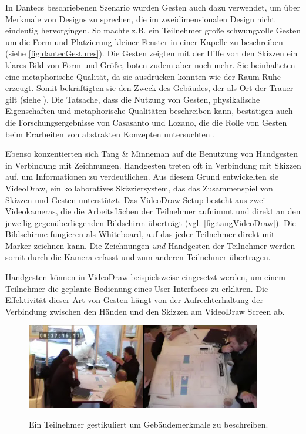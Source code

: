 \medskip In Dantecs beschriebenen Szenario wurden Gesten auch dazu verwendet, um über Merkmale von Designs zu sprechen, die im zweidimensionalen Design nicht eindeutig hervorgingen. So machte z.B. ein Teilnehmer große schwungvolle Gesten um die Form und Platzierung kleiner Fenster in einer Kapelle zu beschreiben (siehe \autoref{fig:dantecGestures}). Die Gesten zeigten mit der Hilfe von den Skizzen ein klares Bild von Form und Größe, boten zudem aber noch mehr. Sie beinhalteten eine metaphorische Qualität, da sie ausdrücken konnten wie der Raum Ruhe erzeugt. Somit bekräftigten sie den Zweck des Gebäudes, der als Ort der Trauer gilt (siehe ). Die Tatsache, dass die Nutzung von Gesten, physikalische Eigenschaften und metaphorische Qualitäten beschreiben kann, bestätigen auch die Forschungsergebnisse von Casasanto und Lozano, die die Rolle von Gesten beim Erarbeiten von abstrakten Konzepten untersuchten \citep{Casasanto:2006}.

\medskip Ebenso konzentierten sich Tang \& Minneman \citep{Tang:1991p28} auf die Benutzung von Handgesten in Verbindung mit Zeichnungen. Handgesten treten oft in Verbindung mit Skizzen auf, um Informationen zu verdeutlichen. Aus diesem Grund entwickelten sie VideoDraw, ein kollaboratives Skizziersystem, das das Zusammenspiel von Skizzen und Gesten unterstützt. Das VideoDraw Setup besteht aus zwei Videokameras, die die Arbeitsflächen der Teilnehmer aufnimmt und direkt an den jeweilig gegenüberliegenden Bildschirm überträgt (vgl. \autoref{fig:tangVideoDraw}). Die Bildschirme fungieren als Whiteboard, auf das jeder Teilnehmer direkt mit Marker zeichnen kann. Die Zeichnungen \emph{und} Handgesten der Teilnehmer werden somit durch die Kamera erfasst und zum anderen Teilnehmer übertragen.

\medskip Handgesten können in VideoDraw beispielsweise eingesetzt werden, um einem Teilnehmer die geplante Bedienung eines User Interfaces zu erklären. Die Effektivität dieser Art von Gesten hängt von der Aufrechterhaltung der Verbindung zwischen den Händen und den Skizzen am VideoDraw Screen ab.

\medskip
\begin{figure}[bth]
	{\includegraphics[width=\linewidth]{gfx/dantecGestures}}
	\caption[Beispiel von Gestik in einem Designmeeting. \citep{Dantec:2009}]{Ein Teilnehmer gestikuliert um Gebäudemerkmale zu beschreiben.}
	\label{fig:dantecGestures}
\end{figure}

